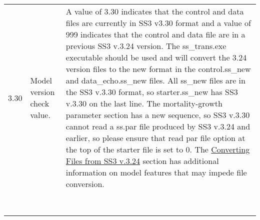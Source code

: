{\begin{landscape}
\begin{longtable}{p{1.5cm} p{7.2cm} p{12.3cm}}
 \pagebreak
 \hline
 \hypertarget{Convert}{3.30} & Model version check value. & \multirow{1}{1cm}[-0.25cm]{\parbox{12.5cm}{ A value of 3.30 indicates that the control and data files are currently in SS3 v3.30 format and a value of 999 indicates that the control and data file are in a previous SS3 v.3.24 version. The ss\_trans.exe executable should be used and will convert the 3.24 version files to the new format in the control.ss\_new and data\_echo.ss\_new files.  All ss\_new files are in the SS3 v.3.30 format, so starter.ss\_new has SS3 v.3.30 on the last line.  The mortality-growth parameter section has a new sequence, so SS3 v.3.30 cannot read a ss.par file produced by SS3 v.3.24 and earlier, so please ensure that read par file option at the top of the starter file is set to 0. The \hyperlink{ConvIssues}{Converting Files from SS3 v.3.24} section has additional information on model features that may impede file conversion.}}\Tstrut\\
     & & \\  
     & & \\  
	 & & \\
     & & \\
   	 & & \\
     & & \\  
     & & \\  
     & & \\       
\end{longtable}
\end{landscape}
}
\restoregeometry





\pagebreak
